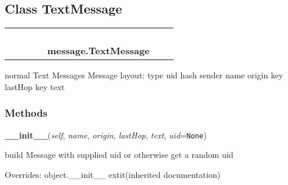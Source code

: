 

\subsection{Class TextMessage}

    \label{message:TextMessage}
\begin{tabular}{cccccccc}
\multicolumn{2}{r}{\settowidth{\BCL}{object}\multirow{2}{\BCL}{object}}
&&
&&
  \\\cline{3-3}
  &&\multicolumn{1}{c|}{}
&&
&&
  \\
\multicolumn{4}{r}{\settowidth{\BCL}{message.Message}\multirow{2}{\BCL}{message.Message}}
&&
  \\\cline{5-5}
  &&&&\multicolumn{1}{c|}{}
&&
  \\
&&&&\multicolumn{2}{l}{\textbf{message.TextMessage}}
\end{tabular}

normal Text Messages Message layout: {\textbar} type {\textbar} uid 
{\textbar} hash {\textbar} sender name {\textbar} origin key {\textbar} 
lastHop key {\textbar} text {\textbar}



  \subsubsection{Methods}

    \vspace{0.5ex}

\hspace{.8\funcindent}\begin{boxedminipage}{\funcwidth}

    \raggedright \textbf{\_\_init\_\_}(\textit{self}, \textit{name}, \textit{origin}, \textit{lastHop}, \textit{text}, \textit{uid}={\tt None})

\setlength{\parskip}{2ex}
    build Message with supplied uid or otherwise get a random uid

\setlength{\parskip}{1ex}
      Overrides: object.\_\_init\_\_ 	extit{(inherited documentation)}

    \end{boxedminipage}

